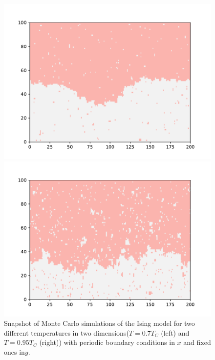 \begin{figure}[t]
	\begin{minipage}[t]{0.5\linewidth}
		\includegraphics[width=\linewidth]{int-dyn/inte07.pdf}
	\end{minipage}%
	\begin{minipage}[t]{0.5\linewidth}
		\includegraphics[width=\linewidth]{int-dyn/inte09.pdf}
	\end{minipage}
	\caption{Snapshot of Monte Carlo simulations of the Ising model for two different temperatures in two dimensions($T=0.7 T_C$ (left) and $T=0.95 T_C$ (right)) with periodic boundary conditions in $x$ and fixed ones in$y$.}
	\label{amas-fixe}
\end{figure}  


